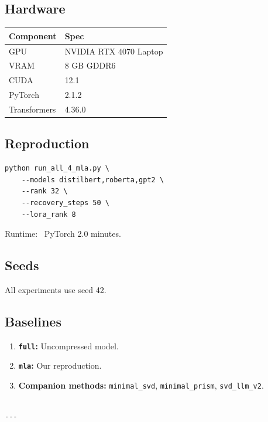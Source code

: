 \subsection{Hardware}

\begin{table}[H]
\centering
\small
\begin{tabular}{ll}
\toprule
\textbf{Component} & \textbf{Spec} \\
\midrule
GPU & NVIDIA RTX 4070 Laptop \\
VRAM & 8 GB GDDR6 \\
CUDA & 12.1 \\
PyTorch & 2.1.2 \\
Transformers & 4.36.0 \\
\bottomrule
\end{tabular}
\end{table}

\subsection{Reproduction}

\begin{lstlisting}
python run_all_4_mla.py \
    --models distilbert,roberta,gpt2 \
    --rank 32 \
    --recovery_steps 50 \
    --lora_rank 8
\end{lstlisting}

Runtime: ~PyTorch 2.0 minutes.

\subsection{Seeds}

All experiments use seed 42.

\subsection{Baselines}

\begin{enumerate}
\item \textbf{\texttt{full}:} Uncompressed model.
\item \textbf{\texttt{mla}:} Our reproduction.
\item \textbf{Companion methods:} \texttt{minimal\_svd}, \texttt{minimal\_prism}, \texttt{svd\_llm\_v2}.
\end{enumerate}
\begin{lstlisting}

---
\end{lstlisting}


